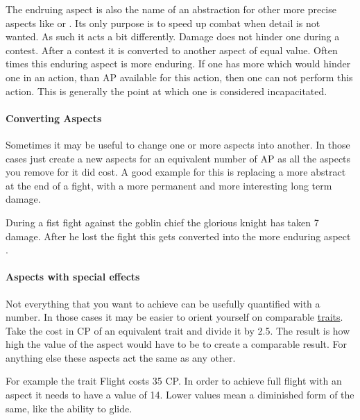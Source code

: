 \documentclass[11pt]{article}
\begin{document}
{The endruing aspect  is also the name of an abstraction for other more precise aspects like  or . Its only purpose is to speed up combat when detail is not wanted. As such it acts a bit differently. Damage does not hinder one during a contest. After a contest it is converted to another aspect of equal value. Often times this enduring aspect is more enduring. If one has more  which would hinder one in an action, than AP available for this action, then one can not perform this action. This is generally the point at which one is considered incapacitated.
\paragraph*{Converting Aspects}
\label{sec:orgc6d90f0}

Sometimes it may be useful to change one or more aspects into another. In those cases just create a new aspects for an equivalent number of AP as all the aspects you remove for it did cost.
A good example for this is replacing a more abstract  at the end of a fight, with a more permanent and more interesting long term damage.

\begin{pwexample}
During a fist fight against the goblin chief the glorious knight has taken 7 damage. After he lost the fight this gets converted into the more enduring aspect . 
\end{pwexample}
\paragraph*{Aspects with special effects}
\label{sec:org79cc38d}

Not everything that you want to achieve can be usefully quantified with a number. In those cases it may be easier to orient yourself on comparable \hyperref[sec:orgb53bd20]{traits}. Take the cost in CP of an equivalent trait and divide it by 2.5. The result is how high the value of the aspect would have to be to create a comparable result. For anything else these aspects act the same as any other.

For example the trait Flight costs 35 CP. In order to achieve full flight with an aspect it needs to have a value of 14. Lower values mean a diminished form of the same, like the ability to glide. 
}
\end{document}
